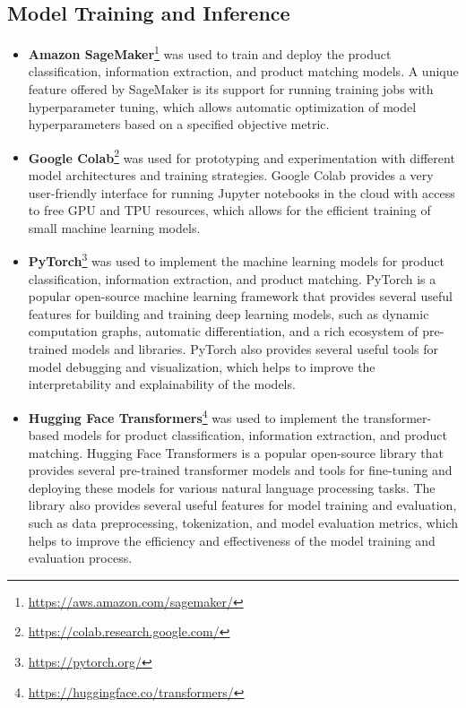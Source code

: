 \subsection{Model Training and Inference}\label{subsec:model_training_and_inference}
\begin{itemize}
    \item \textbf{Amazon SageMaker}\footnote{\url{https://aws.amazon.com/sagemaker/}} was used to train and deploy the product classification, information extraction, and product matching models.
    A unique feature offered by SageMaker is its support for running training jobs with hyperparameter tuning, which allows automatic optimization of model hyperparameters based on a specified objective metric.

    \item \textbf{Google Colab}\footnote{\url{https://colab.research.google.com/}} was used for prototyping and experimentation with different model architectures and training strategies.
    Google Colab provides a very user-friendly interface for running Jupyter notebooks in the cloud with access to free GPU and TPU resources, which allows for the efficient training of small machine learning models.

    \item \textbf{PyTorch}\footnote{\url{https://pytorch.org/}} was used to implement the machine learning models for product classification, information extraction, and product matching.
    PyTorch is a popular open-source machine learning framework that provides several useful features for building and training deep learning models, such as dynamic computation graphs, automatic differentiation, and a rich ecosystem of pre-trained models and libraries.
    PyTorch also provides several useful tools for model debugging and visualization, which helps to improve the interpretability and explainability of the models.

    \item \textbf{Hugging Face Transformers}\footnote{\url{https://huggingface.co/transformers/}} was used to implement the transformer-based models for product classification, information extraction, and product matching.
    Hugging Face Transformers is a popular open-source library that provides several pre-trained transformer models and tools for fine-tuning and deploying these models for various natural language processing tasks.
    The library also provides several useful features for model training and evaluation, such as data preprocessing, tokenization, and model evaluation metrics, which helps to improve the efficiency and effectiveness of the model training and evaluation process.
\end{itemize}

